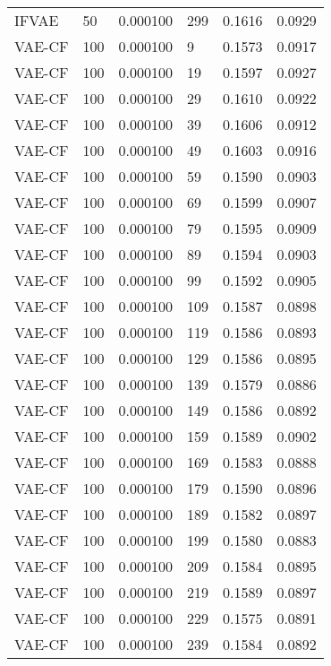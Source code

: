 \begin{tabular}{llrlrr}
   IFVAE &   50 &  0.000100 &   299 &  0.1616 &       0.0929 \\
  VAE-CF &  100 &  0.000100 &     9 &  0.1573 &       0.0917 \\
  VAE-CF &  100 &  0.000100 &    19 &  0.1597 &       0.0927 \\
  VAE-CF &  100 &  0.000100 &    29 &  0.1610 &       0.0922 \\
  VAE-CF &  100 &  0.000100 &    39 &  0.1606 &       0.0912 \\
  VAE-CF &  100 &  0.000100 &    49 &  0.1603 &       0.0916 \\
  VAE-CF &  100 &  0.000100 &    59 &  0.1590 &       0.0903 \\
  VAE-CF &  100 &  0.000100 &    69 &  0.1599 &       0.0907 \\
  VAE-CF &  100 &  0.000100 &    79 &  0.1595 &       0.0909 \\
  VAE-CF &  100 &  0.000100 &    89 &  0.1594 &       0.0903 \\
  VAE-CF &  100 &  0.000100 &    99 &  0.1592 &       0.0905 \\
  VAE-CF &  100 &  0.000100 &   109 &  0.1587 &       0.0898 \\
  VAE-CF &  100 &  0.000100 &   119 &  0.1586 &       0.0893 \\
  VAE-CF &  100 &  0.000100 &   129 &  0.1586 &       0.0895 \\
  VAE-CF &  100 &  0.000100 &   139 &  0.1579 &       0.0886 \\
  VAE-CF &  100 &  0.000100 &   149 &  0.1586 &       0.0892 \\
  VAE-CF &  100 &  0.000100 &   159 &  0.1589 &       0.0902 \\
  VAE-CF &  100 &  0.000100 &   169 &  0.1583 &       0.0888 \\
  VAE-CF &  100 &  0.000100 &   179 &  0.1590 &       0.0896 \\
  VAE-CF &  100 &  0.000100 &   189 &  0.1582 &       0.0897 \\
  VAE-CF &  100 &  0.000100 &   199 &  0.1580 &       0.0883 \\
  VAE-CF &  100 &  0.000100 &   209 &  0.1584 &       0.0895 \\
  VAE-CF &  100 &  0.000100 &   219 &  0.1589 &       0.0897 \\
  VAE-CF &  100 &  0.000100 &   229 &  0.1575 &       0.0891 \\
  VAE-CF &  100 &  0.000100 &   239 &  0.1584 &       0.0892 \\

\end{tabular}
